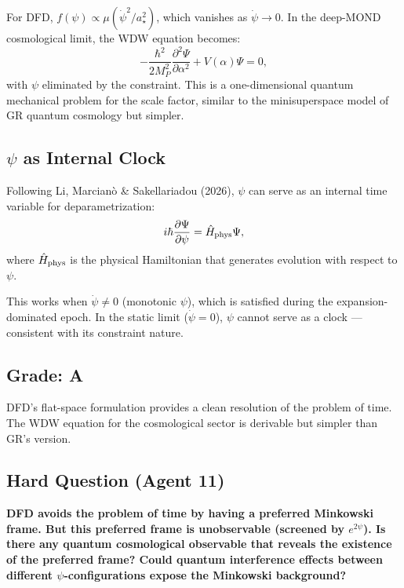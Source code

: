 \documentclass[11pt,a4paper]{article}
\begin{document}
For DFD, $f(\psi) \propto \mu(\dot\psi^2/a_\star^2)$, which vanishes as $\dot\psi \to 0$. In the deep-MOND cosmological limit, the WDW equation becomes:
\begin{equation}
-\frac{\hbar^2}{2M_P^2}\frac{\partial^2\Psi}{\partial\alpha^2} + V(\alpha)\Psi = 0,
\end{equation}
with $\psi$ eliminated by the constraint. This is a one-dimensional quantum mechanical problem for the scale factor, similar to the minisuperspace model of GR quantum cosmology but simpler.

\subsection{$\psi$ as Internal Clock}

Following Li, Marcian\`{o} \& Sakellariadou (2026), $\psi$ can serve as an internal time variable for deparametrization:
\begin{equation}
i\hbar\frac{\partial\Psi}{\partial\psi} = \hat{H}_{\rm phys}\Psi,
\end{equation}
where $\hat{H}_{\rm phys}$ is the physical Hamiltonian that generates evolution with respect to $\psi$.

This works when $\dot\psi \neq 0$ (monotonic $\psi$), which is satisfied during the expansion-dominated epoch. In the static limit ($\dot\psi = 0$), $\psi$ cannot serve as a clock --- consistent with its constraint nature.

\subsection{Grade: A}

DFD's flat-space formulation provides a clean resolution of the problem of time. The WDW equation for the cosmological sector is derivable but simpler than GR's version.

\subsection{Hard Question (Agent 11)}

\textbf{DFD avoids the problem of time by having a preferred Minkowski frame. But this preferred frame is unobservable (screened by $e^{2\psi}$). Is there any quantum cosmological observable that reveals the existence of the preferred frame? Could quantum interference effects between different $\psi$-configurations expose the Minkowski background?}

\newpage
\end{document}
